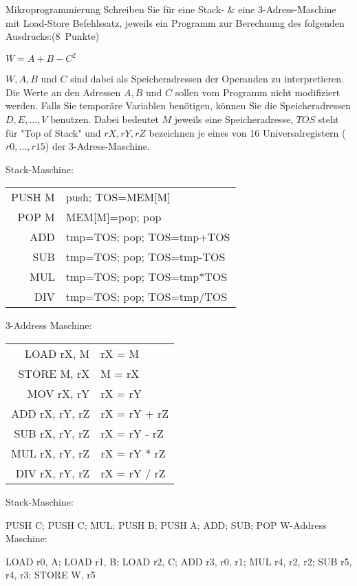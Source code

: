 \documentclass{exercisesheet}
\begin{document}
\begin{exercise}{Mikroprogrammierung}
  Schreiben Sie für eine Stack- \& eine 3-Adress-Maschine mit Load-Store Befehlssatz, jeweils ein Programm zur Berechnung des folgenden Ausdrucks:\hfill(8~Punkte)\par
  \begin{center}$W = A + B - C^2$\end{center}
  $W, A, B$ und $C$ sind dabei als Speicheradressen der Operanden zu interpretieren. Die Werte an den Adressen $A, B$ und $C$ sollen vom Programm nicht modifiziert werden. Falls Sie temporäre Variablen benötigen, können Sie die Speicheradressen $D, E, ..., V$ benutzen. Dabei bedeutet $M$ jeweils eine Speicheradresse, $TOS$ steht für "Top of Stack" und $rX, rY, rZ$ bezeichnen je eines von 16 Universalregistern ($r0, ..., r15$) der 3-Adress-Maschine.

  \begin{multicols}{2}
    Stack-Maschine:\par
    \begin{tabular}{|r|l|}
      \hline
      PUSH M & push; TOS=MEM[M]          \\
      POP M  & MEM[M]=pop; pop           \\
      ADD    & tmp=TOS; pop; TOS=tmp+TOS \\
      SUB    & tmp=TOS; pop; TOS=tmp-TOS \\
      MUL    & tmp=TOS; pop; TOS=tmp*TOS \\
      DIV    & tmp=TOS; pop; TOS=tmp/TOS \\
      \hline
    \end{tabular}
    \columnbreak

    3-Address Maschine:\par
    \begin{tabular}{|r|l|}
      \hline
      LOAD rX, M     & rX = M       \\
      STORE M, rX    & M = rX       \\
      MOV rX, rY     & rX = rY      \\
      ADD rX, rY, rZ & rX = rY + rZ \\
      SUB rX, rY, rZ & rX = rY - rZ \\
      MUL rX, rY, rZ & rX = rY * rZ \\
      DIV rX, rY, rZ & rX = rY / rZ \\
      \hline
    \end{tabular}
  \end{multicols}

  \begin{solution}
    Stack-Maschine:\par PUSH C; PUSH C; MUL; PUSH B; PUSH A; ADD; SUB; POP W-Address Maschine:\par LOAD r0, A; LOAD r1, B; LOAD r2, C; ADD r3, r0, r1; MUL r4, r2, r2;  SUB r5, r4, r3; STORE W, r5
  \end{solution}
\end{exercise}
\end{document}

